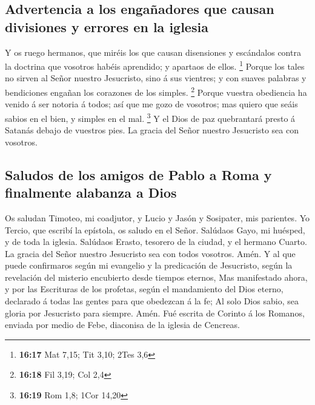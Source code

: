 \hypertarget{advertencia-a-los-engauxf1adores-que-causan-divisiones-y-errores-en-la-iglesia}{%
\subsection{Advertencia a los engañadores que causan divisiones y
errores en la
iglesia}\label{advertencia-a-los-engauxf1adores-que-causan-divisiones-y-errores-en-la-iglesia}}

 Y os ruego hermanos, que miréis los que causan
disensiones y escándalos contra la doctrina que vosotros habéis
aprendido; y apartaos de ellos. \footnote{\textbf{16:17} Mat 7,15; Tit
  3,10; 2Tes 3,6}  Porque los tales no sirven al Señor
nuestro Jesucristo, sino á sus vientres; y con suaves palabras y
bendiciones engañan los corazones de los simples. \footnote{\textbf{16:18}
  Fil 3,19; Col 2,4}  Porque vuestra obediencia ha venido
á ser notoria á todos; así que me gozo de vosotros; mas quiero que seáis
sabios en el bien, y simples en el mal. \footnote{\textbf{16:19} Rom
  1,8; 1Cor 14,20}  Y el Dios de paz quebrantará presto á
Satanás debajo de vuestros pies. La gracia del Señor nuestro Jesucristo
sea con vosotros.

\hypertarget{saludos-de-los-amigos-de-pablo-a-roma-y-finalmente-alabanza-a-dios}{%
\subsection{Saludos de los amigos de Pablo a Roma y finalmente alabanza
a
Dios}\label{saludos-de-los-amigos-de-pablo-a-roma-y-finalmente-alabanza-a-dios}}

 Os saludan Timoteo, mi coadjutor, y Lucio y Jasón y
Sosipater, mis parientes.  Yo Tercio, que escribí la
epístola, os saludo en el Señor.  Salúdaos Gayo, mi
huésped, y de toda la iglesia. Salúdaos Erasto, tesorero de la ciudad, y
el hermano Cuarto.  La gracia del Señor nuestro
Jesucristo sea con todos vosotros. Amén.  Y al que puede
confirmaros según mi evangelio y la predicación de Jesucristo, según la
revelación del misterio encubierto desde tiempos eternos,
 Mas manifestado ahora, y por las Escrituras de los
profetas, según el mandamiento del Dios eterno, declarado á todas las
gentes para que obedezcan á la fe;  Al solo Dios sabio,
sea gloria por Jesucristo para siempre. Amén. Fué escrita de Corinto á
los Romanos, enviada por medio de Febe, diaconisa de la iglesia de
Cencreas.
